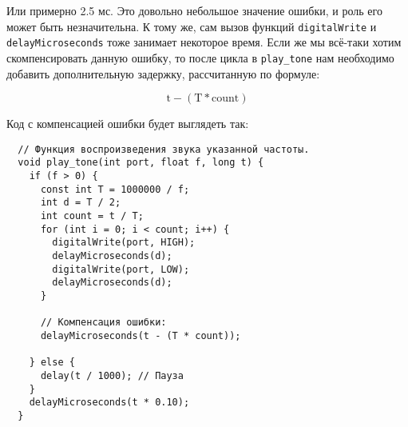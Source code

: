 \documentclass[../sparc.tex]{subfiles}
\begin{document}
Или примерно 2.5 мс.  Это довольно небольшое значение ошибки, и роль его может
быть незначительна.  К тому же, сам вызов функций \texttt{digitalWrite} и
\texttt{delayMicroseconds} тоже занимает некоторое время.  Если же мы всё-таки
хотим скомпенсировать данную ошибку, то после цикла в \texttt{play\_tone} нам
необходимо добавить дополнительную задержку, рассчитанную по формуле:

\begin{equation}
  \mbox{t} - (\mbox{T} * \mbox{count})
\end{equation}

Код с компенсацией ошибки будет выглядеть так:

\begin{verbatim}
  // Функция воспроизведения звука указанной частоты.
  void play_tone(int port, float f, long t) {
    if (f > 0) {
      const int T = 1000000 / f;
      int d = T / 2;
      int count = t / T;
      for (int i = 0; i < count; i++) {
        digitalWrite(port, HIGH);
        delayMicroseconds(d);
        digitalWrite(port, LOW);
        delayMicroseconds(d);
      }

      // Компенсация ошибки:
      delayMicroseconds(t - (T * count));

    } else {
      delay(t / 1000); // Пауза
    }
    delayMicroseconds(t * 0.10);
  }
\end{verbatim}
\end{document}
